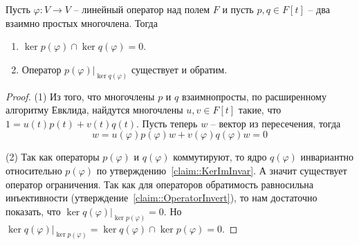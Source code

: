\begin{claim}
\label{claim::CoprimeKernels}
Пусть $\varphi\colon V\to V$ -- линейный оператор над полем $F$ и пусть $p,q\in F[t]$ -- два взаимно простых многочлена.
Тогда 
\begin{enumerate}
\item $\ker p(\varphi)\cap \ker q(\varphi) = 0$.

\item Оператор $p(\varphi)|_{\ker q(\varphi)}$ существует и обратим.
\end{enumerate}
\end{claim}
\begin{proof}
(1)  Из того, что многочлены $p$ и $q$ взаимнопросты, по расширенному алгоритму Евклида, найдутся многочлены $u,v\in F[t]$ такие, что $1 = u(t)p(t) + v(t)q(t)$.
Пусть теперь $w$ -- вектор из пересечения, тогда
\[
w = u(\varphi) p(\varphi) w + v(\varphi) q(\varphi) w = 0
\]

(2) Так как операторы $p(\varphi)$ и $q(\varphi)$ коммутируют, то ядро $q(\varphi)$ инвариантно относительно $p(\varphi)$ по утверждению~\ref{claim::KerImInvar}.
А значит существует оператор ограничения.
Так как для операторов обратимость равносильна инъективности (утверждение~\ref{claim::OperatorInvert}), то нам достаточно показать, что $\ker q(\varphi)|_{\ker p(\varphi)} = 0$.
Но $\ker q(\varphi)|_{\ker p(\varphi)} = \ker q(\varphi) \cap \ker p(\varphi) = 0$.
\end{proof}

